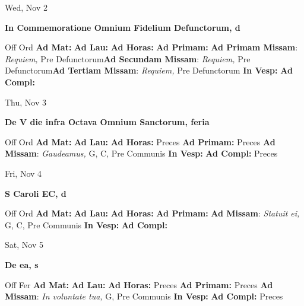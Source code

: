 \documentclass[10pt]{article}
\begin{document}
\begin{minipage}{3.5in}
\vspace{2em}\begin{center}
Wed, Nov 2
\end{center}\textbf{ \large In Commemoratione Omnium Fidelium Defunctorum, \textnormal{\normalsize d}}
\begin{justify}
Off Ord
\textbf{Ad Mat: }
\textbf{Ad Lau: }
\textbf{Ad Horas: }
\textbf{Ad Primam: }
\textbf{Ad Primam Missam}: \textit{Requiem,} Pre Defunctorum\textbf{Ad Secundam Missam}: \textit{Requiem,} Pre Defunctorum\textbf{Ad Tertiam Missam}: \textit{Requiem,} Pre Defunctorum
\textbf{In Vesp: }
\textbf{Ad Compl: }\end{justify}
\end{minipage}



\begin{minipage}{3.5in}
\vspace{2em}\begin{center}
Thu, Nov 3
\end{center}\textbf{ \large De V die infra Octava Omnium Sanctorum, \textnormal{\normalsize feria}}
\begin{justify}
Off Ord
\textbf{Ad Mat: }
\textbf{Ad Lau: }
\textbf{Ad Horas: }Preces
\textbf{Ad Primam: }Preces
\textbf{Ad Missam}: \textit{Gaudeamus,} G, C, Pre Communis
\textbf{In Vesp: }
\textbf{Ad Compl: }Preces\end{justify}
\end{minipage}



\begin{minipage}{3.5in}
\vspace{2em}\begin{center}
Fri, Nov 4
\end{center}\textbf{ \large S Caroli EC, \textnormal{\normalsize d}}
\begin{justify}
Off Ord
\textbf{Ad Mat: }
\textbf{Ad Lau: }
\textbf{Ad Horas: }
\textbf{Ad Primam: }
\textbf{Ad Missam}: \textit{Statuit ei,} G, C, Pre Communis
\textbf{In Vesp: }
\textbf{Ad Compl: }\end{justify}
\end{minipage}



\begin{minipage}{3.5in}
\vspace{2em}\begin{center}
Sat, Nov 5
\end{center}\textbf{ \large De ea, \textnormal{\normalsize s}}
\begin{justify}
Off Fer
\textbf{Ad Mat: }
\textbf{Ad Lau: }
\textbf{Ad Horas: }Preces
\textbf{Ad Primam: }Preces
\textbf{Ad Missam}: \textit{In voluntate tua,} G, Pre Communis
\textbf{In Vesp: }
\textbf{Ad Compl: }Preces\end{justify}
\end{minipage}
\end{document}
